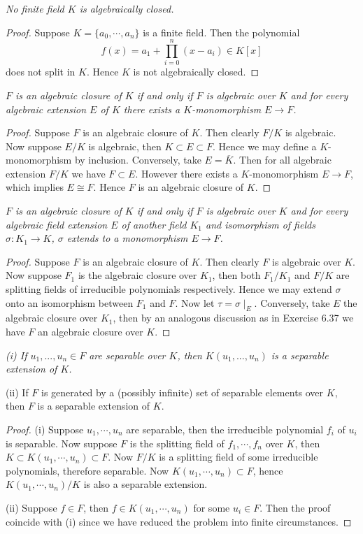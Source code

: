 \begin{problem}\em
No finite field $K$ is algebraically closed.
\end{problem}
\begin{proof}
Suppose $K=\{a_0,\cdots,a_n\}$ is a finite field. Then the polynomial 
$$
f\left( x \right) =a_1+\prod_{i=0}^n{\left( x-a_i \right)}\in K\left[ x \right] 
$$
does not split in $K$. Hence $K$ is not algebraically closed.
\end{proof}
\begin{problem}\em
$F$ is an algebraic closure of $K$ if and only if $F$ is algebraic over $K$ and for every algebraic extension $E$ of $K$ there exists a $K$-monomorphism $E\to F$.
\end{problem}
\begin{proof}
Suppose $F$ is an algebraic closure of $K$. Then clearly $F/K$ is algebraic. Now suppose $E/K$ is algebraic, then $K\subset E\subset F$. Hence we may define a $K$-monomorphism by inclusion. Conversely, take $E=\overline{K}$. Then for all algebraic extension $F/K$ we have $F\subset E$. However there exists a $K$-monomorphism $E\to F$, which implies $E\cong F$. Hence $F$ is an algebraic closure of $K$.
\end{proof}
\begin{problem}\em
$F$ is an algebraic closure of $K$ if and only if $F$ is algebraic over $K$ and for every algebraic field extension $E$ of another field $K_1$ and isomorphism of fields $\sigma:K_1\to K$, $\sigma$ extends to a monomorphism $E\to F$.
\end{problem}
\begin{proof}
Suppose $F$ is an algebraic closure of $K$. Then clearly $F$ is algebraic over $K$. Now suppose $F_1$ is the algebraic closure over $K_1$, then both $F_1/K_1$ and $F/K$ are splitting fields of irreducible polynomials respectively. Hence we may extend $\sigma$ onto an isomorphism between $F_1$ and $F$. Now let $\tau=\sigma\mid_E$. Conversely, take $E$ the algebraic closure over $K_1$, then by an analogous discussion as in Exercise 6.37 we have $F$ an algebraic closure over $K$.
\end{proof}
\begin{problem}\em
(i) If $u_1, ..., u_n\in F$ are separable over $K$, then $K(u_1, ..., u_n)$ is a separable extension of $K$.\par
(ii) If $F$ is generated by a (possibly infinite) set of separable elements over $K$, then $F$ is a separable extension of $K$.
\end{problem}
\begin{proof}
(i) Suppose $u_1,\cdots,u_n$ are separable, then the irreducible polynomial $f_i$ of $u_i$ is separable. Now suppose $F$ is the splitting field of $f_1,\cdots,f_n$ over $K$, then $K\subset K(u_1,\cdots,u_n)\subset F$. Now $F/K$ is a splitting field of some irreducible polynomials, therefore separable. Now $K(u_1,\cdots,u_n)\subset F$, hence $K(u_1,\cdots,u_n)/K$ is also a separable extension.\par
(ii) Suppose $f\in F$, then $f\in K(u_1,\cdots,u_n)$ for some $u_i\in F$. Then the proof coincide with (i) since we have reduced the problem into finite circumstances.
\end{proof}
